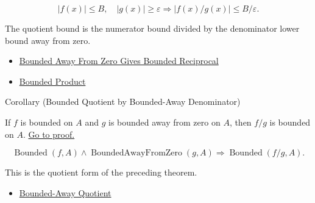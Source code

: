 \begin{remark*}
\[
  |f(x)|\leq B,\quad |g(x)|\geq\varepsilon
  \Rightarrow
  |f(x)/g(x)|\leq B/\varepsilon.
\]
\end{remark*}

\begin{remark*}[Interpretation]
The quotient bound is the numerator bound divided by the denominator lower
bound away from zero.
\end{remark*}

\begin{dependencies}
\begin{itemize}
  \item \hyperref[thm:bounded-away-from-zero-gives-bounded-reciprocal]{Bounded Away From Zero Gives Bounded Reciprocal}
  \item \hyperref[cor:bounded-product]{Bounded Product}
\end{itemize}
\end{dependencies}

\begin{corollarybox}{Corollary (Bounded Quotient by Bounded-Away Denominator)}
\begin{corollary}
\label{cor:bounded-quotient-by-bounded-away-denominator}
If \(f\) is bounded on \(A\) and \(g\) is bounded away from zero on \(A\),
then \(f/g\) is bounded on \(A\).
\hyperref[prf:bounded-quotient-by-bounded-away-denominator]{Go to proof.}
\end{corollary}
\end{corollarybox}

\begin{remark*}
\[
  \operatorname{Bounded}(f,A)\wedge\operatorname{BoundedAwayFromZero}(g,A)
  \Rightarrow \operatorname{Bounded}(f/g,A).
\]
\end{remark*}

\begin{remark*}[Interpretation]
This is the quotient form of the preceding theorem.
\end{remark*}

\begin{dependencies}
\begin{itemize}
  \item \hyperref[thm:bounded-away-quotient]{Bounded-Away Quotient}
\end{itemize}
\end{dependencies}


